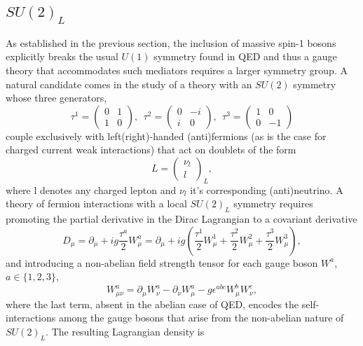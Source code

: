 \subsection{$SU(2)_L$}
As established in the previous section, the inclusion of massive spin-1 bosons explicitly breaks the usual $U(1)$ symmetry found in QED and thus a gauge theory that accommodates such mediators requires a larger symmetry group. A natural candidate comes in the study of a theory with an $SU(2)$ symmetry whose three generators, 
\begin{equation}
 \tau^1=\left(\begin{array}{cc}
0 & 1\\
1 & 0
\end{array}\right),~~\tau^{2}=\left(\begin{array}{cc}
0 & -i\\
i & 0
\end{array}\right),~~\tau^{3}=\left(\begin{array}{cc}
1 & 0\\
0 & -1
\end{array}\right)
\end{equation}
couple exclusively with left(right)-handed (anti)fermions (as is the case for charged current weak interactions) that act on doublets of the form 
\begin{equation}
  L = \left(\begin{array}{c} \nu_{l}\\ l \end{array}\right)_L,
\end{equation}
where l denotes any charged lepton and $\nu_l$ it's corresponding (anti)neutrino. A theory of fermion interactions with a local $SU(2)_L$ symmetry requires promoting the partial derivative in the Dirac Lagrangian to a covariant derivative
\begin{equation}
  D_{\mu} = \partial_\mu + ig\frac{\tau^a}{2}W^a_\mu 
  = \partial_\mu + ig\left(\frac{\tau^1}{2}W^1_\mu 
  + \frac{\tau^2}{2}W^2_\mu + \frac{\tau^3}{2}W^3_\mu\right),
\end{equation}
and introducing a non-abelian field strength tensor for each gauge boson 
$W^a$, $a \in \{1,2,3\}$,
\begin{equation}
  W^a_{\mu\nu} = \partial_\mu W^a_\nu - \partial_\nu W^a_\mu 
  - g\epsilon^{abc}W^b_\mu W^c_\nu,
\end{equation}
where the last term, absent in the abelian case of QED, encodes the self-interactions among the gauge bosons that arise from the non-abelian nature of $SU(2)_L$. The resulting Lagrangian density is

